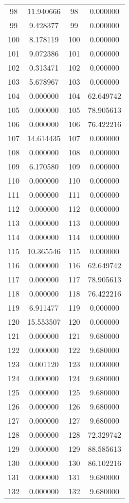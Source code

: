 \documentclass[12pt]{article}
\begin{document}
\begin{longtable}{@{}cccc@{}}
98 & 11.940666 & 98 & 0.000000 \\
99 & 9.428377 & 99 & 0.000000 \\
100 & 8.178119 & 100 & 0.000000 \\
101 & 9.072386 & 101 & 0.000000 \\
102 & 0.313471 & 102 & 0.000000 \\
103 & 5.678967 & 103 & 0.000000 \\
104 & 0.000000 & 104 & 62.649742 \\
105 & 0.000000 & 105 & 78.905613 \\
106 & 0.000000 & 106 & 76.422216 \\
107 & 14.614435 & 107 & 0.000000 \\
108 & 0.000000 & 108 & 0.000000 \\
109 & 6.170580 & 109 & 0.000000 \\
110 & 0.000000 & 110 & 0.000000 \\
111 & 0.000000 & 111 & 0.000000 \\
112 & 0.000000 & 112 & 0.000000 \\
113 & 0.000000 & 113 & 0.000000 \\
114 & 0.000000 & 114 & 0.000000 \\
115 & 10.365546 & 115 & 0.000000 \\
116 & 0.000000 & 116 & 62.649742 \\
117 & 0.000000 & 117 & 78.905613 \\
118 & 0.000000 & 118 & 76.422216 \\
119 & 6.911477 & 119 & 0.000000 \\
120 & 15.553507 & 120 & 0.000000 \\
121 & 0.000000 & 121 & 9.680000 \\
122 & 0.000000 & 122 & 9.680000 \\
123 & 0.001120 & 123 & 0.000000 \\
124 & 0.000000 & 124 & 9.680000 \\
125 & 0.000000 & 125 & 9.680000 \\
126 & 0.000000 & 126 & 9.680000 \\
127 & 0.000000 & 127 & 9.680000 \\
128 & 0.000000 & 128 & 72.329742 \\
129 & 0.000000 & 129 & 88.585613 \\
130 & 0.000000 & 130 & 86.102216 \\
131 & 0.000000 & 131 & 9.680000 \\
132 & 0.000000 & 132 & 9.680000 \\

\end{longtable}
\end{document}
